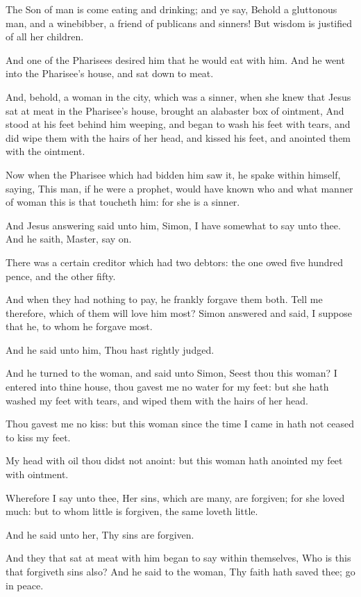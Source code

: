 \verse The Son of man is come eating and drinking; and ye say, Behold a gluttonous man, and a winebibber, a friend of publicans and sinners!  \verse But wisdom is justified of all her children.

\verse And one of the Pharisees desired him that he would eat with him.  And he went into the Pharisee's house, and sat down to meat.

\verse And, behold, a woman in the city, which was a sinner, when she knew that Jesus sat at meat in the Pharisee's house, brought an alabaster box of ointment, \verse And stood at his feet behind him weeping, and began to wash his feet with tears, and did wipe them with the hairs of her head, and kissed his feet, and anointed them with the ointment.

\verse Now when the Pharisee which had bidden him saw it, he spake within himself, saying, This man, if he were a prophet, would have known who and what manner of woman this is that toucheth him: for she is a sinner.

\verse And Jesus answering said unto him, Simon, I have somewhat to say unto thee. And he saith, Master, say on.

\verse There was a certain creditor which had two debtors: the one owed five hundred pence, and the other fifty.

\verse And when they had nothing to pay, he frankly forgave them both.  Tell me therefore, which of them will love him most?  \verse Simon answered and said, I suppose that he, to whom he forgave most.

And he said unto him, Thou hast rightly judged.

\verse And he turned to the woman, and said unto Simon, Seest thou this woman? I entered into thine house, thou gavest me no water for my feet: but she hath washed my feet with tears, and wiped them with the hairs of her head.

\verse Thou gavest me no kiss: but this woman since the time I came in hath not ceased to kiss my feet.

\verse My head with oil thou didst not anoint: but this woman hath anointed my feet with ointment.

\verse Wherefore I say unto thee, Her sins, which are many, are forgiven; for she loved much: but to whom little is forgiven, the same loveth little.

\verse And he said unto her, Thy sins are forgiven.

\verse And they that sat at meat with him began to say within themselves, Who is this that forgiveth sins also?  \verse And he said to the woman, Thy faith hath saved thee; go in peace.



